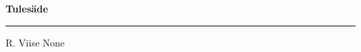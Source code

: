 \documentclass[10pt]{book}
\begin{document}
{
  \samepage
  \raggedbottom
  \raggedright
  \sloppy


  \vspace{0.2in}

  \noindent\begin{minipage}{.1\textwidth}
    \hfill\vspace{0.1in}
  \end{minipage}%
  \noindent\begin{minipage}{.8\textwidth}
    \centering
    \bfseries
    \large Tules\"ade
  \end{minipage}%
  \noindent\begin{minipage}{.1\textwidth}
      \hfill\vspace{0.1in}
  \end{minipage}

  \nopagebreak[4]
  \vspace{0.1in}
  \nopagebreak[4]
  \hrule height 0.05ex
  \nopagebreak[4]
  \vspace{-0.05in}

  {\footnotesize R. Viise \hfill None }\\
  \vspace{0.01in}



}
\end{document}
